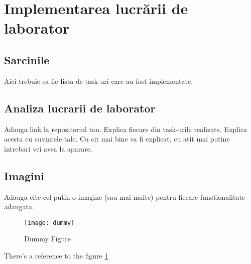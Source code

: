 \section{Implementarea lucrării de laborator}

\subsection{Sarcinile}

Aici trebuie sa fie lista de task-uri care au fost implementate.

\subsection{Analiza lucrarii de laborator}

Adauga link la repozitoriul tau.
Explica fiecare din task-urile realizate. Explica acesta cu cuvintele tale. Cu cit mai bine va fi explicat,
cu atit mai putine intrebari vei avea la aparare.

\subsection{Imagini}

Adauga cite cel putin o imagine (sau mai multe) pentru fiecare functionalitate adaugata.

\begin{figure}[!ht]
\centering
\texttt{[image: dummy]}
\caption{Dummy Figure}\label{dummy}
\end{figure}

There's a reference to the figure \ref{dummy}

\clearpage
